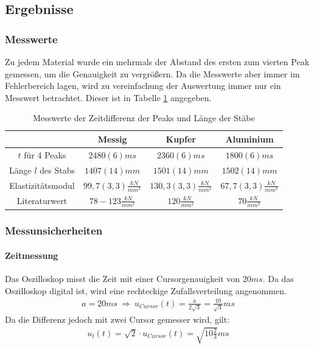 \documentclass[11pt, a4paper]{article}
\begin{document}
    \subsection{Ergebnisse}
    \subsubsection{Messwerte}
    Zu jedem Material wurde ein mehrmals der Abstand des ersten zum
    vierten Peak gemessen, um die Genauigkeit zu vergrößern. Da die Messwerte aber immer im Fehlerbereich lagen,
    wird zu vereinfachung der Auswertung immer nur ein Messwert betrachtet. Dieser ist in Tabelle \ref{ex:mess1}
    angegeben. 
    \begin{table}[]
        \centering
        \begin{tabular}{c | c | c | c}
           & Messig & Kupfer & Aluminium \\ \hline
            $ t $ für 4 Peaks & $ 2480(6)ms $ & $ 2360(6)ms $ & $ 1800(6)ms $ \\ \hline
            Länge $l$ des Stabs & $1407(14)mm$ & $1501(14)mm$ & $1502(14)mm$ \\ \hline
            Elastizitätsmodul & $99,7(3,3)\frac{kN}{mm^2}$ & $130,3(3,3)\frac{kN}{mm^2}$ & $67,7(3,3)\frac{kN}{mm^2}$ \\ \hline
            Literaturwert & $78-123\frac{kN}{mm^2}$ & $120\frac{kN}{mm^2}$ & $70\frac{kN}{mm^2}$
        \end{tabular}
        \caption{Messwerte der Zeitdifferenz der Peaks und Länge der  Stäbe}
        \label{ex:mess1}
    \end{table}
    \subsubsection{Messunsicherheiten}
    \paragraph{Zeitmessung}
    Das Oszilloskop misst die Zeit mit einer Cursorgenauigkeit von $ 20ms $. Da das Oszilloskop digital ist, wird
    eine rechteckige Zufallsverteilung angenommen.
    \begin{align}
        a = 20ms \ \Rightarrow \ u_{Cursor}(t) = \frac{a}{2 \sqrt{3}} = \frac{10}{\sqrt{3}}ms
    \end{align}
    Da die Differenz jedoch mit zwei Cursor gemesser wird, gilt:
    \begin{align} \label{eqt}
        u_{t}(t) = \sqrt{2} \cdot u_{Cursor}(t) = \sqrt{10\frac{2}{3}}ms
    \end{align}
\end{document}
